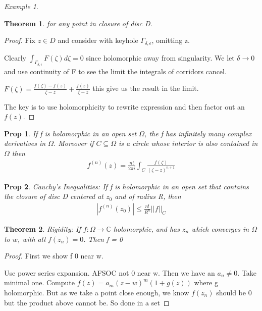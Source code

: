 \documentclass[11pt]{article}
\newcommand{\C}{\mathbb{C}}
\newtheorem{theorem}{Theorem}
\newtheorem{prop}{Prop}
\theoremstyle{remark}
\newtheorem{example}{Example}
\begin{document}
\begin{example}
\begin{theorem}
	for any point in closure of disc D.
\end{theorem}

\begin{proof}
	Fix $z \in D$ and consider with keyhole $\Gamma_{\delta,\epsilon}$, omitting z. 

	Clearly $\int_{\Gamma_{\delta,\epsilon}} F(\zeta) d\zeta = 0$ since holomorphic away from singularity. We let $\delta \to 0$ and use continuity of F to see the limit the integrals of corridors cancel. 

	$F(\zeta) = \frac{f(\zeta) - f(z)}{\zeta - z} + \frac{f(z)}{\zeta  - z}$ this give us the result in the limit.

	The key is to use holomorphicity to rewrite expression and then factor out an $f(z)$. 

\end{proof}

\begin{prop}
	If f is holomorphic in an open set $\Omega$, the f has infinitely many complex derivatives in $\Omega$. Moreover if $C \subseteq \Omega$ is a circle whose interior is also contained in $\Omega$ then
	\begin{align*}
		f^{(n)}(z) = \frac{n!}{2 \pi i} \int_C \frac{f(\zeta)}{(\zeta - z)^{n+1}}
	\end{align*}
\end{prop}

\begin{prop}
	Cauchy's Inequalities: If f is holomorphic in an open set that contains the closure of disc D centered at $z_0$ and of radius R, then
	\begin{align*}
		|f^{(n)}(z_0)| \leq \frac{n!}{R^n}||f||_C
	\end{align*}
\end{prop}

\begin{theorem}
	\textit{Rigidity}: If $f : \Omega \to \C$ holomorphic, and has $z_n$ which converges in $\Omega$ to $w$, with all $f(z_n) = 0$. Then f = 0
\end{theorem}

\begin{proof}
	First we show f 0 near w. 

	Use power series expansion. AFSOC not 0 near w. Then we have an $a_n \neq 0$. Take minimal one. Compute $f(z) = a_m(z-w)^m(1+g(z))$ where g holomorphic. But as we take a point close enough, we know $f(z_n)$ should be 0 but the product above cannot be. So done in a set


\end{proof}
\end{example}
\end{document}
